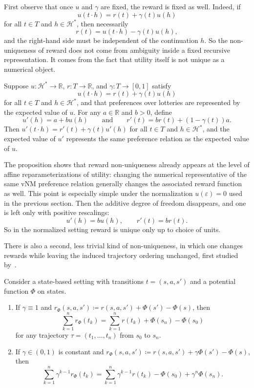\documentclass[11pt]{article}
\newcommand{\Hcal}{\mathcal{H}}
\newcommand{\R}{\mathbb{R}}
\newcommand{\emptytraj}{\varepsilon}
\begin{document}
First observe that once $u$ and $\gamma$ are fixed, the reward is fixed as
well. Indeed, if
\[
u(t\cdot h)=r(t)+\gamma(t)u(h)
\]
for all $t\in T$ and $h\in\Hcal^*$, then necessarily
\[
r(t)=u(t\cdot h)-\gamma(t)u(h),
\]
and the right-hand side must be independent of the continuation $h$. So the
non-uniqueness of reward does not come from ambiguity inside a fixed recursive
representation. It comes from the fact that utility itself is not unique as a
numerical object.

\begin{proposition}
Suppose $u\colon \Hcal^*\to\R$, $r\colon T\to\R$, and
$\gamma\colon T\to[0,1]$ satisfy
\[
u(t\cdot h)=r(t)+\gamma(t)u(h)
\]
for all $t\in T$ and $h\in\Hcal^*$, and that preferences over lotteries are
represented by the expected value of $u$. For any $a\in\R$ and $b>0$, define
\[
u'(h)=a+bu(h)
\qquad\text{and}\qquad
r'(t)=br(t)+(1-\gamma(t))a.
\]
Then $u'(t\cdot h)=r'(t)+\gamma(t)u'(h)$ for all $t\in T$ and $h\in\Hcal^*$, and
the expected value of $u'$ represents the same preference relation as the
expected value of $u$.
\end{proposition}

The proposition shows that reward non-uniqueness already appears at the level
of affine reparameterizations of utility: changing the numerical representative
of the same vNM preference relation generally changes the associated reward
function as well. 
This point is especially simple under the normalization $u(\emptytraj)=0$ used
in the previous section. Then the additive degree of freedom disappears, and one
is left only with positive rescalings:
\[
u'(h)=bu(h),
\qquad
r'(t)=br(t).
\]
So in the normalized setting reward is unique only up to choice of units. 

There is also a second, less trivial kind of non-uniqueness, in which one
changes rewards while leaving the induced trajectory ordering unchanged, first
studied by~\citet{ng1999policy}.

\begin{proposition}
Consider a state-based setting with transitions $t=(s,a,s')$ and a potential
function $\Phi$ on states.
\begin{enumerate}[label=(\alph*)]
\item If $\gamma\equiv 1$ and
$r_\Phi(s,a,s') \coloneqq r(s,a,s')+\Phi(s')-\Phi(s)$, 
then 
\[
\sum_{k=1}^n r_\Phi(t_k)
=
\sum_{k=1}^n r(t_k)+\Phi(s_n)-\Phi(s_0)
\]
for any trajectory $\tau=(t_1,\dots,t_n)$ from $s_0$ to $s_n$. 

\item If $\gamma\in(0,1)$ is constant and
$r_\Phi(s,a,s') \coloneqq r(s,a,s')+\gamma \Phi(s')-\Phi(s)$, 
then
\[
\sum_{k=1}^n \gamma^{k-1}r_\Phi(t_k)
=
\sum_{k=1}^n \gamma^{k-1}r(t_k)-\Phi(s_0)+\gamma^n\Phi(s_n).
\]
\end{enumerate}
\end{proposition}
\end{document}

